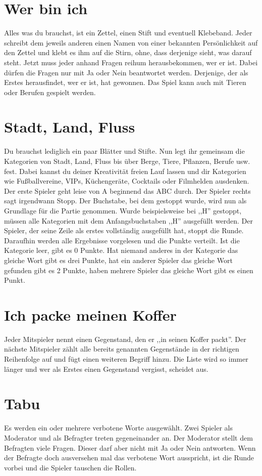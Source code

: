 \documentclass[a4paper]{report}
\begin{document}
\section*{Wer bin ich}
Alles was du brauchst, ist ein Zettel, einen Stift und eventuell Klebeband.
Jeder schreibt dem jeweils anderen einen Namen von einer bekannten Persönlichkeit auf den Zettel und klebt es ihm auf die Stirn, ohne, dass derjenige sieht, was darauf steht. Jetzt muss jeder anhand Fragen reihum herausbekommen, wer er ist. Dabei dürfen die Fragen nur mit Ja oder Nein beantwortet werden. Derjenige, der als Erstes herausfindet, wer er ist, hat gewonnen. Das Spiel kann auch mit Tieren oder Berufen gespielt werden.

\section*{Stadt, Land, Fluss}
Du brauchst lediglich ein paar Blätter und Stifte. Nun legt ihr gemeinsam die Kategorien von Stadt, Land, Fluss bis über Berge, Tiere, Pflanzen, Berufe usw. fest. Dabei kannst du deiner Kreativität freien Lauf lassen und dir Kategorien wie Fußballvereine, VIPs, Küchengeräte, Cocktails oder Filmhelden ausdenken.
Der erste Spieler geht leise von A beginnend das ABC durch. Der Spieler rechts sagt irgendwann Stopp. Der Buchstabe, bei dem gestoppt wurde, wird nun als Grundlage für die Partie genommen. Wurde beispielsweise bei ,,H'' gestoppt, müssen alle Kategorien mit dem Anfangsbuchstaben ,,H'' ausgefüllt werden. Der Spieler, der seine Zeile als erstes vollständig ausgefüllt hat, stoppt die Runde. Daraufhin werden alle Ergebnisse vorgelesen und die Punkte verteilt.
Ist die Kategorie leer, gibt es 0 Punkte. Hat niemand anderes in der Kategorie das gleiche Wort gibt es drei Punkte, hat ein anderer Spieler das gleiche Wort gefunden gibt es 2 Punkte, haben mehrere Spieler das gleiche Wort gibt es einen Punkt.

\section*{Ich packe meinen Koffer}
Jeder Mitspieler nennt einen Gegenstand, den er ,,in seinen Koffer packt''. Der nächste Mitspieler zählt alle bereits genannten Gegenstände in der richtigen Reihenfolge auf und fügt einen weiteren Begriff hinzu. Die Liste wird so immer länger und wer als Erstes einen Gegenstand vergisst, scheidet aus.

\section*{Tabu}
Es werden ein oder mehrere verbotene Worte ausgewählt. Zwei Spieler als Moderator und als Befragter treten gegeneinander an. Der Moderator stellt dem Befragten viele Fragen. Dieser darf aber nicht mit Ja oder Nein antworten. Wenn der Befragte doch ausversehen mal das verbotene Wort ausspricht, ist die Runde vorbei und die Spieler tauschen die Rollen.
\end{document}
